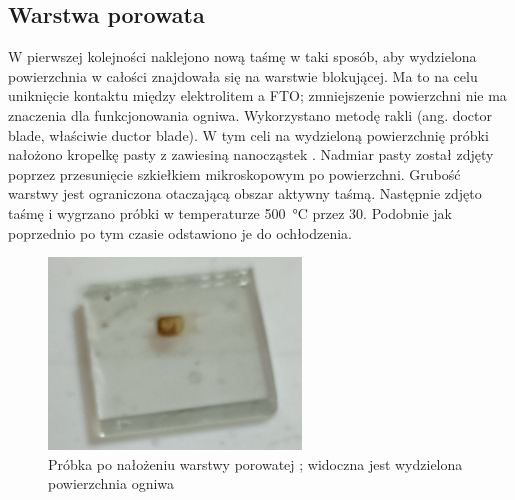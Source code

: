 \documentclass[a4, 12pt]{article}
\begin{document}
	\subsection{Warstwa porowata }
	W pierwszej kolejności naklejono nową taśmę w taki sposób, aby wydzielona powierzchnia w całości znajdowała się na warstwie blokującej. Ma to na celu uniknięcie kontaktu między elektrolitem a FTO; zmniejszenie powierzchni nie ma znaczenia dla funkcjonowania ogniwa. Wykorzystano metodę rakli (ang. doctor blade, właściwie ductor blade). W tym celi na wydzieloną powierzchnię próbki nałożono kropelkę pasty z zawiesiną nanocząstek . Nadmiar pasty został zdjęty poprzez przesunięcie szkiełkiem mikroskopowym po powierzchni. Grubość warstwy jest ograniczona otaczającą obszar aktywny taśmą. Następnie zdjęto taśmę i wygrzano próbki w temperaturze \qty{500}{\degreeCelsius} przez \qty{30}{\min}. Podobnie jak poprzednio po tym czasie odstawiono je do ochłodzenia. 
	\begin{figure}[H]
		\centering
		\includegraphics[width=0.6\textwidth]{probki_tio2_poro.png}
		\caption{Próbka po nałożeniu warstwy porowatej ; widoczna jest wydzielona powierzchnia ogniwa}
	\end{figure}
	
\end{document}
